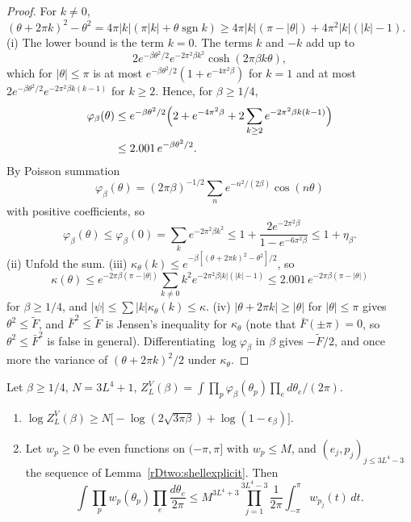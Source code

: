 \begin{proof}
For $k\ne0$, $(\theta+2\pi k)^2-\theta^2=4\pi\lvert k\rvert(\pi\lvert k\rvert
+\theta\operatorname{sgn}k)\ge4\pi\lvert k\rvert(\pi-\lvert\theta\rvert)+4
\pi^2\lvert k\rvert(\lvert k\rvert-1)$. (i) The lower bound is the term $k=0$.
The terms $k$ and $-k$ add up to
\[
2e^{-\beta\theta^2/2}e^{-2\pi^2\beta k^2}\cosh(2\pi\beta k\theta),
\]
which for $\lvert\theta\rvert\le\pi$ is at most $e^{-\beta\theta^2/2}(1+
e^{-4\pi^2\beta})$ for $k=1$ and at most $2e^{-\beta\theta^2/2}e^{-2\pi^2
\beta k(k-1)}$ for $k\ge2$. Hence, for $\beta\ge1/4$,
\begin{align*}
\varphi_\beta(\theta)&\le e^{-\beta\theta^2/2}\Bigl(2+e^{-4\pi^2\beta}+2
\sum_{k\ge2}e^{-2\pi^2\beta k(k-1)}\Bigr)\\
&\le2.001\,e^{-\beta\theta^2/2}.
\end{align*}
By Poisson summation
\[
\varphi_\beta(\theta)=(2\pi\beta)^{-1/2}\sum_ne^{-n^2/(2\beta)}\cos(n\theta)
\]
with positive coefficients, so
\[
\varphi_\beta(\theta)\le\varphi_\beta(0)=\sum_ke^{-2\pi^2\beta k^2}
\le1+\frac{2e^{-2\pi^2\beta}}{1-e^{-6\pi^2\beta}}\le1+\eta_\beta.
\]
(ii) Unfold the sum. (iii) $\kappa_\theta(k)\le
e^{-\beta[(\theta+2\pi k)^2-\theta^2]/2}$, so
\[
\kappa(\theta)\le e^{-2\pi\beta(\pi-\lvert\theta\rvert)}
\sum_{k\ne0}k^2e^{-2\pi^2\beta\lvert k\rvert(\lvert k\rvert-1)}
\le2.001\,e^{-2\pi\beta(\pi-\lvert\theta\rvert)}
\]
for $\beta\ge1/4$,
and $\lvert\psi\rvert\le\sum\lvert k\rvert\kappa_\theta(k)\le\kappa$. (iv)
$\lvert\theta+2\pi k\rvert\ge\lvert\theta\rvert$ for $\lvert\theta\rvert\le\pi$
gives $\theta^2\le\tilde F$, and $\bar F^2\le\tilde F$ is Jensen's inequality
for $\kappa_\theta$ (note that $\bar F(\pm\pi)=0$, so $\theta^2\le\bar F^2$
is false in general). Differentiating $\log\varphi_\beta$ in $\beta$ gives
$-\tilde F/2$, and once more the variance of $(\theta+2\pi k)^2/2$ under
$\kappa_\theta$.
\end{proof}

\begin{proposition}\label{rDtwo:villainZ}
Let $\beta\ge1/4$, $N=3L^4+1$, $Z^V_L(\beta)=\int\prod_p\varphi_\beta(
\theta_p)\prod_ed\theta_e/(2\pi)$.
\begin{enumerate}[label=\textup{(\roman*)},leftmargin=*]
\item $\log Z^V_L(\beta)\ge N\bigl[-\log(2\sqrt{3\pi\beta})+\log(1-\epsilon_
\beta)\bigr]$.
\item Let $w_p\ge0$ be even functions on $(-\pi,\pi]$ with $w_p\le M$, and
$(e_j,p_j)_{j\le3L^4-3}$ the sequence of Lemma~\ref{rDtwo:shellexplicit}.
Then
\[
\int\prod_pw_p(\theta_p)\prod_e\frac{d\theta_e}{2\pi}\le M^{3L^4+3}\prod_{j=1}
^{3L^4-3}\frac1{2\pi}\int_{-\pi}^\pi w_{p_j}(t)\,dt .
\]
\end{enumerate}
\end{proposition}

